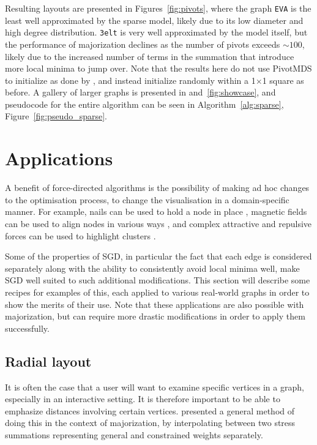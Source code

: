 Resulting layouts are presented in Figures~\ref{fig:pivots}, where the graph \texttt{EVA} is the least well approximated by the sparse model, likely due to its low diameter and high degree distribution. \texttt{3elt} is very well approximated by the model itself, but the performance of majorization declines as the number of pivots exceeds ${\sim}100$, likely due to the increased number of terms in the summation that introduce more local minima to jump over.
Note that the results here do not use PivotMDS \citep{Brandes2007Eigensolver} to initialize as done by \citet{Ortmann2017}, and instead initialize randomly within a 1$\times$1 square as before.
A gallery of larger graphs is presented in and~\ref{fig:showcase}, and pseudocode for the entire algorithm can be seen in Algorithm~\ref{alg:sparse}, Figure~\ref{fig:pseudo_sparse}.


\section{Applications}
\label{sec:cookbook}
A benefit of force-directed algorithms is the possibility of making ad hoc changes to the optimisation process, to change the visualisation in a domain-specific manner. For example, nails can be used to hold a node in place \citep{Mi2016}, magnetic fields can be used to align nodes in various ways \citep{Sugiyama1994}, and complex attractive and repulsive forces can be used to highlight clusters \citep{Suh2019}.

Some of the properties of SGD, in particular the fact that each edge is considered separately along with the ability to consistently avoid local minima well, make SGD well suited to such additional modifications. This section will describe some recipes for examples of this, each applied to various real-world graphs in order to show the merits of their use.
Note that these applications are also possible with majorization, but can require more drastic modifications in order to apply them successfully.

\subsection{Radial layout}
\label{sec:sgd_radial}

It is often the case that a user will want to examine specific vertices in a graph, especially in an interactive setting. It is therefore important to be able to emphasize distances involving certain vertices.
\citet{Brandes2011} presented a general method of doing this in the context of majorization, by interpolating between two stress summations representing general and constrained weights separately.

